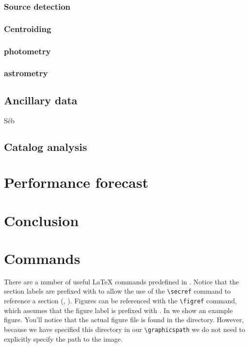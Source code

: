 \documentclass[\docopts]{\docclass}
\begin{document}
\subsubsection{Source detection}
\label{sec:detection}

\subsubsection{Centroiding}
\label{sec:centroiding}

\subsubsection{photometry}
\label{sec:photometry}

\subsubsection{astrometry}
\label{sec:astrometry}

\subsection{Ancillary data}
\label{sec:ancillary}

Séb

\subsection{Catalog analysis}
\label{sec:analysis}


\section{Performance forecast}
\label{sec:forecast}


\section{Conclusion}
\label{sec:conclusion}


\section{Commands}
\label{sec:commands}

There are a number of useful \LaTeX\xspace commands predefined in .
Notice that the section labels are prefixed with  to allow the use of the \verb=\secref= command to reference a section (\ie, ).
Figures can be referenced with the \verb=\figref= command, which assumes that the figure label is prefixed with .
In  we show an example figure.
You'll notice that the actual figure file is found in the  directory.
However, because we have specified this directory in our \verb=\graphicspath= we do not need to explicitly specify the path to the image.
\end{document}
